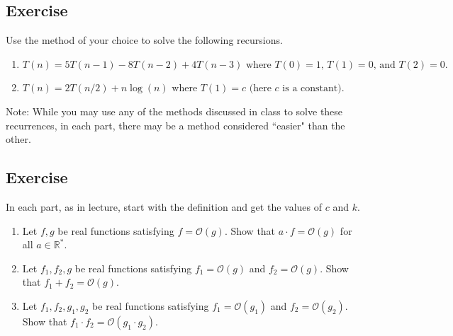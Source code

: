 \documentclass{article}
\newcounter{counter}
\newcommand{\Exercise}{Exercise \stepcounter{counter}\thecounter}
\begin{document}
\subsection*{\Exercise}
    Use the method of your choice to solve the following recursions.
    \begin{enumerate}
        \item $T(n) = 5T(n - 1) - 8T(n - 2) + 4T(n - 3) \text{ where $T(0) = 1$, $T(1) = 0$, and $T(2) = 0$}.$
        \item $T(n) = 2T(n/2) + n\log(n) \text{ where } T(1) = c \text{ (here $c$ is a constant)}.$
    \end{enumerate}
    {\small Note: While you may use any of the methods discussed in class to solve these recurrences, in each part, there may be a method considered ``easier" than the other.}

\subsection*{\Exercise}
    In each part, as in lecture, start with the definition and get the values of $c$ and $k$.
    \begin{enumerate}
        \item Let $f, g$ be real functions satisfying $f = \mathcal{O}(g)$. Show that $a \cdot f = \mathcal{O}(g)$ for all $a \in \mathbb{R}^{*}$.
        \item Let $f_{1}, f_{2}, g$ be real functions satisfying $f_{1} = \mathcal{O}(g)$ and $f_{2} = \mathcal{O}(g)$. Show that $f_{1} + f_{2} = \mathcal{O}(g)$.
        \item Let $f_{1}, f_{2}, g_{1}, g_{2}$ be real functions satisfying $f_{1} = \mathcal{O}(g_{1})$ and $f_{2} = \mathcal{O}(g_{2})$. Show that $f_{1} \cdot f_{2} = \mathcal{O}(g_{1} \cdot g_{2})$.
    \end{enumerate}
\end{document}
